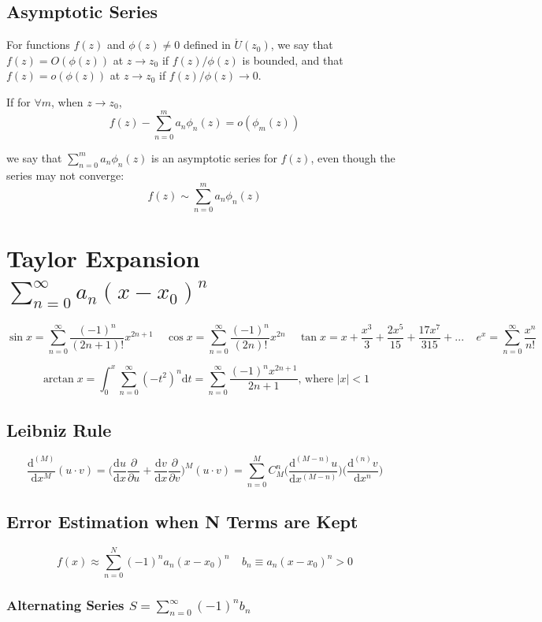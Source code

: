 \documentclass[10pt]{article}
\newcommand{\dd}{\mathrm{d}}
\begin{document}
\subsection{Asymptotic Series}

For functions $f(z)$ and $\phi(z)\neq 0$ defined in $\mathring{U}(z_0)$, we say that $f(z) = O(\phi(z))$ at $z\to z_0$ if $f(z)/\phi(z)$ is bounded, and that $f(z) = o(\phi(z))$ at $z\to z_0$ if $f(z)/\phi(z) \to 0$.

If for $\forall m$, when $z\to z_0$,
$$
f(z) - \sum_{n=0}^m a_n \phi_n(z) = o(\phi_m(z))
$$

we say that $\sum_{n=0}^m a_n \phi_n(z)$ is an asymptotic series for $f(z)$, even though the series may not converge:
$$
f(z) \sim \sum_{n=0}^m a_n \phi_n(z)
$$

\section[Taylor Expansion]{Taylor Expansion $\sum_{n=0}^\infty a_n (x-x_0)^n$}
$$
\sin x = \sum_{n=0}^\infty \frac{(-1)^n}{(2n+1)!} x^{2n+1}\ \ \ \ \ \cos x = \sum_{n=0}^\infty \frac{(-1)^n}{(2n)!} x^{2n}\ \ \ \ \ \tan x = x + \frac{x^3}{3} + \frac{2x^5}{15} + \frac{17x^7}{315} + ...\ \ \ \ \ e^{x} = \sum_{n=0}^\infty \frac{x^n}{n!}
$$

$$
\arctan x = \int_0^x \sum_{n=0}^\infty (-t^2)^n \dd t = \sum_{n=0}^\infty \frac{(-1)^n x^{2n+1}}{2n+1} \text{, where } |x| < 1
$$

\subsection{Leibniz Rule}
$$
\frac{\dd^{(M)}}{\dd x^M} (u\cdot v) = \bigg(\frac{\dd u}{\dd x}\frac{\partial}{\partial u} + \frac{\dd v}{\dd x}\frac{\partial}{\partial v}\bigg)^M (u\cdot v) = \sum_{n=0}^M C_M^n \bigg(\frac{\dd^{(M-n)} u}{\dd x^{(M-n)}}\bigg) \bigg(\frac{\dd^{(n)} v}{\dd x^n}\bigg)
$$

\subsection{Error Estimation when N Terms are Kept}
$$
f(x) \approx \sum_{n=0}^N (-1)^n a_n (x-x_0)^n\ \ \ \ \ b_n \equiv a_n(x-x_0)^n > 0
$$

\subsubsection[Alternating Series]{Alternating Series $S = \sum_{n=0}^\infty (-1)^n b_n$}
\end{document}
